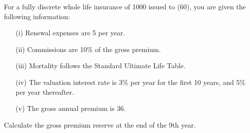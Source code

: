 For a fully discrete whole life insurance of 1000 issued to (60), you are given the
following information:
\begin{itemize}
  \item[(i)] Renewal expenses are 5 per year.
  \item[(ii)] Commissions are 10\% of the gross premium.
  \item[(iii)] Mortality follows the Standard Ultimate Life Table.
  \item[(iv)] The valuation interest rate is 3\% per year for the first 10 years, and 5\% per year thereafter.
  \item[(v)] The gross annual premium is 36.
\end{itemize}

Calculate the gross premium reserve at the end of the 9th year.
